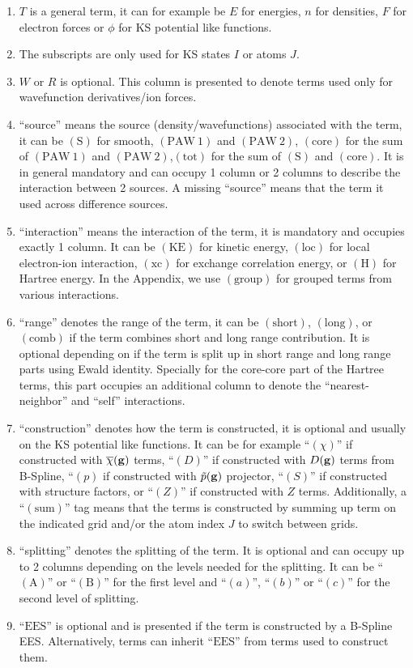 \documentclass[paper=a4, fontsize=11pt]{article} %
\numberwithin{equation}{section} %
\numberwithin{figure}{section} %
\numberwithin{table}{section} %
\newcommand{\ol}{\overline}
\newcommand{\bg}{{\bf{g}}}
\newcommand{\rS}{{\mathrm{S}}}
\newcommand{\rKE}{{\mathrm{KE}}}
\newcommand{\rEES}{{\mathrm{EES}}}
\newcommand{\rxc}{{\mathrm{xc}}}
\newcommand{\rgr}{{\mathrm{group}}}
\newcommand{\rcore}{{\mathrm{core}}}
\newcommand{\rshort}{{\mathrm{short}}}
\newcommand{\rlong}{{\mathrm{long}}}
\newcommand{\rP}{{\mathrm{PAW}}}
\newcommand{\rH}{{\mathrm{H}}}
\newcommand{\rA}{{\mathrm{A}}}
\newcommand{\rB}{{\mathrm{B}}}
\newcommand{\rsum}{{\mathrm{sum}}}
\newcommand{\rcomb}{{\mathrm{comb}}}
\newcommand{\rlo}{{\mathrm{loc}}}
\newcommand{\rtot}{{\mathrm{tot}}}
\begin{document}
\begin{enumerate}
\item $T$ is a general term, it can for example be $E$ for energies, $n$ for densities, $F$ for electron forces or $\phi$ for KS potential like functions.
\item The subscripts are only used for KS states $I$ or atoms $J$.
\item $W$ or $R$ is optional. This column is presented to denote terms used only for wavefunction derivatives/ion forces.
\item ``source'' means the source (density/wavefunctions) associated with the term, it can be $(\rS)$ for smooth, $(\rP\ 1)$ and $(\rP\ 2)$, $(\rcore)$ for the sum of $(\rP\ 1)$ and $(\rP\ 2)$,$(\rtot)$ for the sum of $(\rS)$ and $(\rcore)$. It is in general mandatory and can occupy 1 column or 2 columns to describe the interaction between 2 sources. A missing ``source'' means that the term it used across difference sources.
\item ``interaction'' means the interaction of the term, it is mandatory and occupies exactly 1 column. It can be $(\rKE)$ for kinetic energy, $(\rlo)$ for local electron-ion interaction, $(\rxc)$ for exchange correlation energy, or $(\rH)$ for Hartree energy. In the Appendix, we use $(\rgr)$ for grouped terms from various interactions.
\item ``range'' denotes the range of the term, it can be $(\rshort)$, $(\rlong)$, or $(\rcomb)$ if the term combines short and long range contribution. It is optional depending on if the term is split up in short range and long range parts using Ewald identity. Specially for the core-core part of the Hartree terms, this part occupies an additional column to denote the ``nearest-neighbor'' and ``self'' interactions.
\item ``construction'' denotes how the term is constructed, it is optional and usually on the KS potential like functions. It can be for example ``$(\chi)$'' if constructed with $\ol \chi(\bg)$ terms, ``$(D)$'' if constructed with $D(\bg)$ terms from B-Spline, ``$(p)$ if constructed with $\tilde p(\bg)$ projector, ``$(S)$'' if constructed with structure factors, or ``$(Z)$'' if constructed with $Z$ terms. Additionally, a ``$(\rsum)$'' tag means that the terms is constructed by summing up term on the indicated grid and/or the atom index $J$ to switch between grids.  
\item ``splitting'' denotes the splitting of the term. It is optional and can occupy up to 2 columns depending on the levels needed for the splitting. It can be ``$(\rA)$'' or ``$(\rB)$'' for the first level and ``$(a)$'', ``$(b)$'' or ``$(c)$'' for the second level of splitting.
\item ``$\rEES$'' is optional and is presented if the term is constructed by a B-Spline EES. Alternatively, terms can inherit ``$\rEES$'' from terms used to construct them.
\end{enumerate}
\end{document}
